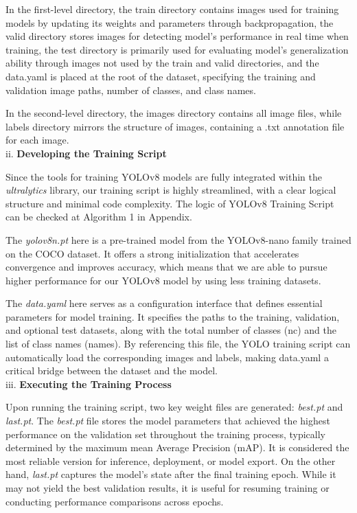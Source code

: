 \documentclass[journal,transmag]{IEEEtran}
\begin{document}
In the first-level directory, the train directory contains images used for training models by updating its weights and parameters through backpropagation, the valid directory stores images for detecting model's performance in real time when training, the test directory is primarily used for evaluating model's generalization ability through images not used by the train and valid directories, and the data.yaml is placed at the root of the dataset, specifying the training and validation image paths, number of classes, and class names.

In the second-level directory, the images directory contains all image files, while labels directory mirrors the structure of images, containing a .txt annotation file for each image. \\

ii. \textbf{Developing the Training Script} 

Since the tools for training YOLOv8 models are fully integrated within the \textit{ultralytics} library, our training script is highly streamlined, with a clear logical structure and minimal code complexity. The logic of YOLOv8 Training Script can be checked at Algorithm 1 in Appendix. 

The \textit{yolov8n.pt} here is a pre-trained model from the YOLOv8-nano family trained on the COCO dataset. It offers a strong initialization that accelerates convergence and improves accuracy, which means that we are able to pursue higher performance for our YOLOv8 model by using less training datasets. 

The \textit{data.yaml} here serves as a configuration  interface that defines essential parameters for model training. It specifies the paths to the training, validation, and optional test datasets, along with the total number of classes (nc) and the list of class names (names). By referencing this file, the YOLO training script can automatically load the corresponding images and labels, making data.yaml a critical bridge between the dataset and the model.\\


iii. \textbf{Executing the Training Process} 

Upon running the training script, two key weight files are generated: \textit{best.pt} and \textit{last.pt}. The \textit{best.pt} file stores the model parameters that achieved the highest performance on the validation set throughout the training process, typically determined by the maximum mean Average Precision (mAP). It is considered the most reliable version for inference, deployment, or model export. On the other hand, \textit{last.pt} captures the model’s state after the final training epoch. While it may not yield the best validation results, it is useful for resuming training or conducting performance comparisons across epochs. 
\end{document}
